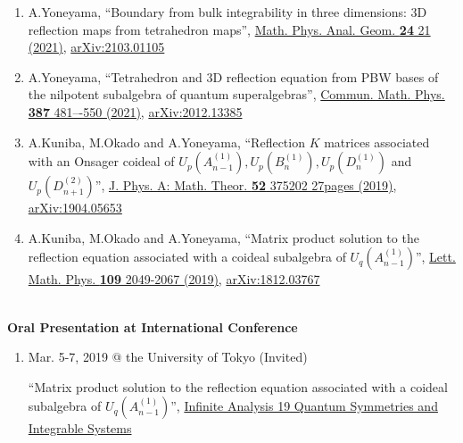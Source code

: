 \documentclass[dvipdfmx]{jsarticle}
\begin{document}
\begin{enumerate}
\renewcommand*\theenumi{\the\numexpr\value{paperCounter}-\value{enumi}}
\setcounter{paperCounter}{5}
\item
A.Yoneyama, ``Boundary from bulk integrability in three dimensions: 3D reflection maps from tetrahedron maps'', \href{https://doi.org/10.1007/s11040-021-09393-3}{Math. Phys. Anal. Geom. {\bf 24} 21 (2021)}, \href{https://arxiv.org/abs/2103.01105}{arXiv:2103.01105}
%
%
\item
A.Yoneyama, ``Tetrahedron and 3D reflection equation from PBW bases of the nilpotent subalgebra of quantum superalgebras'', \href{https://doi.org/10.1007/s00220-021-04098-8}{Commun. Math. Phys. {\bf 387} 481–-550 (2021)}, \href{https://arxiv.org/abs/2012.13385}{arXiv:2012.13385}
%
%
\item
A.Kuniba, M.Okado and A.Yoneyama, ``Reflection $K$ matrices associated with an Onsager coideal of $U_p(A_{n-1}^{(1)}),U_p(B_n^{(1)}),U_p(D_n^{(1)})$ and $U_p(D_{n+1}^{(2)})$'', \href{https://iopscience.iop.org/article/10.1088/1751-8121/ab3715}{J. Phys. A: Math. Theor. {\bf 52} 375202 27pages (2019)}, \href{https://arxiv.org/abs/1904.05653}{arXiv:1904.05653}
%
%
\item
A.Kuniba, M.Okado and A.Yoneyama, ``Matrix product solution to the reflection equation associated with a coideal subalgebra of $U_q(A_{n-1}^{(1)})$'', \href{http://links.springernature.com/f/a/VdNxbTDs8BDjk4rQBBmAjw~~/AABE5gA~/RgRekPU6P0QwaHR0cDovL3d3dy5zcHJpbmdlci5jb20vLS8wL0FXb09qTHhwT3VHTGE4WnNvSjRvVwNzcGNCCgAAusGvXDBnf-5SIHlvbmV5YW1hQGdva3V0YW4uYy51LXRva3lvLmFjLmpwWAQAAAbn}{Lett. Math. Phys. {\bf 109} 2049-2067 (2019)}, \href{https://arxiv.org/abs/1812.03767}{arXiv:1812.03767}
\end{enumerate}
%
%
%
%
{\ }\\
\vspace{3mm}
{\bf\large Oral Presentation at International Conference}
\vspace{-6mm}
\\\hrulefill
\begin{enumerate}
\renewcommand*\theenumi{\the\numexpr\value{paperCounter2}-\value{enumi}}
\setcounter{paperCounter2}{2}
\item
Mar. 5-7, 2019 @ the University of Tokyo (Invited)
\par
``Matrix product solution to the reflection equation associated with a coideal subalgebra of $U_q(A_{n-1}^{(1)})$'', \href{https://sites.google.com/view/ia19/home}{Infinite Analysis 19 Quantum Symmetries and Integrable Systems}
\end{enumerate}
\end{document}
